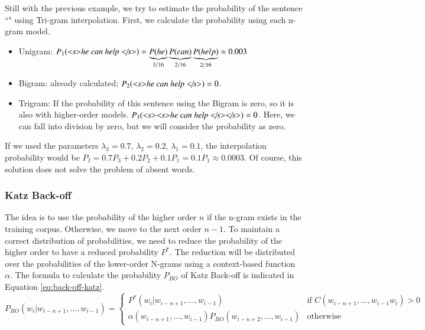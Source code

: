 \documentclass{KBook}
\begin{document}
Still with the previous example, we try to estimate the probability of the sentence ``"
using Tri-gram interpolation.
First, we calculate the probability using each n-gram model.
\begin{itemize}
	\item Unigram: 
	$P_1(\text{\textit{\textless s\textgreater he can help \textless/s\textgreater}}) = 
	\underbrace{P(he)}_{3/16}
	\underbrace{P(can)}_{2/16} 
	\underbrace{P(help)}_{2/16} \approx 0.003$
	
	\item Bigram: already calculated; $P_2(\text{\textit{\textless s\textgreater he can help \textless/s\textgreater}})=0$.
	
	\item Trigram: If the probability of this sentence using the Bigram is zero, so it is also with higher-order models. 
	$P_3(\text{\textit{\textless s\textgreater \textless s\textgreater he can help \textless/s\textgreater \textless/s\textgreater}})=0$.
	Here, we can fall into division by zero, but we will consider the probability as zero.
\end{itemize}
%
If we used the parameters $\lambda_3=0.7,\, \lambda_2=0.2,\, \lambda_1 = 0.1$, the interpolation probability would be $P_I = 0.7 P_3 + 0.2 P_2 + 0.1 P_1 = 0.1 P_1 \approx 0.0003$. 
Of course, this solution does not solve the problem of absent words.

\subsubsection{Katz Back-off}

The idea is to use the probability of the higher order $n$ if the n-gram exists in the training corpus. 
Otherwise, we move to the next order $n-1$.
To maintain a correct distribution of probabilities, we need to reduce the probability of the higher order to have a reduced probability $P^*$. 
The reduction will be distributed over the probabilities of the lower-order N-grams using a context-based function $\alpha$.
The formula to calculate the probability $P_{BO}$ of Katz Back-off is indicated in Equation \ref{eq:back-off-katz}.
\begin{equation}
	P_{BO}(w_i | w_{i-n+1}, \ldots, w_{i-1}) = 
	\begin{cases}
		P^*(w_i | w_{i-n+1}, \ldots, w_{i-1}) & \text{if } C(w_{i-n+1}, \ldots, w_{i-1} w_i) > 0 \\
		\alpha(w_{i-n+1}, \ldots, w_{i-1}) P_{BO}(w_{i-n+2}, \ldots, w_{i-1}) & \text{otherwise}
	\end{cases}
	\label{eq:back-off-katz}
\end{equation}
\end{document}
